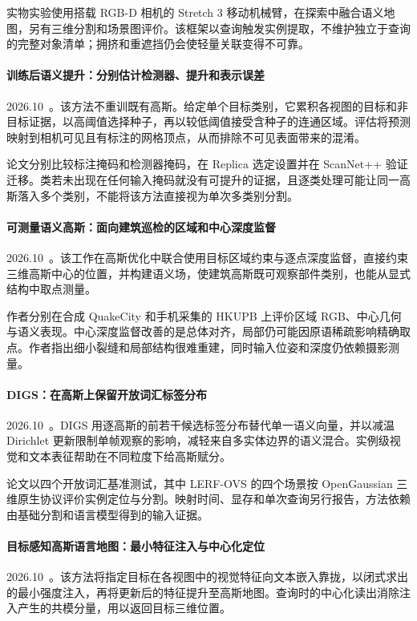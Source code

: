 实物实验使用搭载 RGB-D 相机的 Stretch 3 移动机械臂，在探索中融合语义地图，另有三维分割和场景图评价。该框架以查询触发实例提取，不维护独立于查询的完整对象清单；拥挤和重遮挡仍会使轻量关联变得不可靠。

\paragraph{训练后语义提升：分别估计检测器、提升和表示误差}
2026.10~\cite{2610_08756}。该方法不重训既有高斯。给定单个目标类别，它累积各视图的目标和非目标证据，以高阈值选择种子，再以较低阈值接受含种子的连通区域。评估将预测映射到相机可见且有标注的网格顶点，从而排除不可见表面带来的混淆。

论文分别比较标注掩码和检测器掩码，在 Replica 选定设置并在 ScanNet++ 验证迁移。类若未出现在任何输入掩码就没有可提升的证据，且逐类处理可能让同一高斯落入多个类别，不能将该方法直接视为单次多类别分割。

\paragraph{可测量语义高斯：面向建筑巡检的区域和中心深度监督}
2026.10~\cite{2610_13143}。该工作在高斯优化中联合使用目标区域约束与逐点深度监督，直接约束三维高斯中心的位置，并构建语义场，使建筑高斯既可观察部件类别，也能从显式结构中取点测量。

作者分别在合成 QuakeCity 和手机采集的 HKUPB 上评价区域 RGB、中心几何与语义表现。中心深度监督改善的是总体对齐，局部仍可能因原语稀疏影响精确取点。作者指出细小裂缝和局部结构很难重建，同时输入位姿和深度仍依赖摄影测量。

\paragraph{DIGS：在高斯上保留开放词汇标签分布}
2026.10~\cite{2610_16177}。DIGS 用逐高斯的前若干候选标签分布替代单一语义向量，并以减温 Dirichlet 更新限制单帧观察的影响，减轻来自多实体边界的语义混合。实例级视觉和文本表征帮助在不同粒度下给高斯赋分。

论文以四个开放词汇基准测试，其中 LERF-OVS 的四个场景按 OpenGaussian 三维原生协议评价实例定位与分割。映射时间、显存和单次查询另行报告，方法依赖由基础分割和语言模型得到的输入证据。

\paragraph{目标感知高斯语言地图：最小特征注入与中心化定位}
2026.10~\cite{2610_21619}。该方法将指定目标在各视图中的视觉特征向文本嵌入靠拢，以闭式求出的最小强度注入，再将更新后的特征提升至高斯地图。查询时的中心化读出消除注入产生的共模分量，用以返回目标三维位置。

